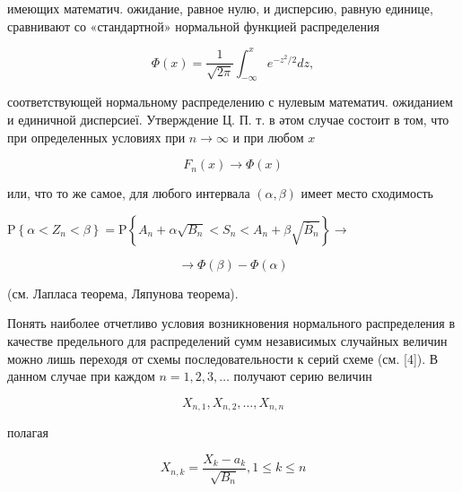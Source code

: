 \documentclass[10pt]{article}
\begin{document}
имеющих математич. ожидание, равное нулю, и дисперсию, равную единице, сравнивают со «стандартной» нормальной функцией распределения



\[

\Phi(x)=\frac{1}{\sqrt{2 \pi}} \int_{-\infty}^{x} e^{-z^{2} / 2} d z,

\]



соответствующей нормальному распределению с нулевым математич. ожиданием и единичной дисперсиеї. Утверждение Ц. П. т. в әтом случае состоит в том, что при определенных условиях при $n \rightarrow \infty$ и при любом $x$



\[

F_{n}(x) \rightarrow \Phi(x)

\]



или, что то же самое, для любого интервала $(\alpha, \beta)$ имеет место сходимость



$\mathrm{P}\left\{\alpha<Z_{n}<\beta\right\}=\mathrm{P}\left\{A_{n}+\alpha \sqrt{B_{n}}<S_{n}<A_{n}+\beta \sqrt{\bar{B}_{n}}\right\} \rightarrow$



\[

\rightarrow \Phi(\beta)-\Phi(\alpha)

\]



(см. Лапласа теорема, Ляпунова теорема).



Понять наиболее отчетливо условия возникновения нормального распределения в качестве предельного для распределений сумм независимых случайных величин можно лишь переходя от схемы последовательности к серий схеме (см. [4]). В данном случае при каждом $n=1,2,3, \ldots$ получают серию величин



\[

X_{n, 1}, X_{n, 2}, \ldots, X_{n, n}

\]



полагая



\[

X_{n, k}=\frac{X_{k}-a_{k}}{\sqrt{B_{n}}}, 1 \leqslant k \leqslant n

\]
\end{document}
